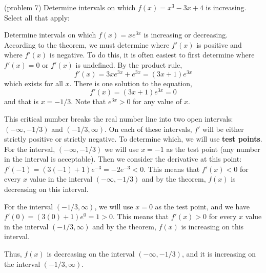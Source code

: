\documentclass[handout]{ximera}
\begin{document}
\begin{problem}(problem 7)
Determine intervals on which $f(x) = x^3 - 3x  + 4$ is increasing.\\
Select all that apply:
\begin{selectAll}
\end{selectAll}

\end{problem}


\begin{example}[example 8]
Determine intervals on which $f(x) = xe^{3x}$ is increasing or decreasing.\\
According to the theorem, we must determine where $f'(x)$ is positive and  
where $f'(x)$ is negative. 
To do this, it is often easiest to first determine where $f'(x) = 0$ or 
$f'(x)$ is undefined. By the  product rule, 
\[f'(x) = 3xe^{3x} + e^{3x} = (3x+1)e^{3x}\] 
which exists for all $x$. There is one solution to the equation,
\[f'(x) = (3x+1)e^{3x} = 0\] 
and that is  $x=-1/3$. 
Note that $e^{3x} > 0$ for any value of $x$.

This critical number breaks the real number line into two open 
intervals: $(-\infty, -1/3)$ and $(-1/3, \infty)$.
On each of these intervals, $f'$ will be either strictly positive or strictly negative.  
To determine which, we will use \textbf{test points}. 
For the interval, $(-\infty, -1/3)$ we will use $x=-1$ as the test 
point (any number in the interval is acceptable). 
Then we consider the derivative at this point: $f'(-1) = (3(-1) + 1)e^{-3} = -2e^{-3} <0$.
This means that $f'(x) < 0$ for every $x$ value in the 
interval $(-\infty, -1/3)$ and by the theorem, 
$f(x)$ is decreasing on this interval.



For the interval $(-1/3, \infty)$, we will use $x=0$ as the test point, and we 
have $f'(0) = (3(0)+1)e^0 = 1>0$. 
This means that $f'(x) > 0$ for every $x$ value in the interval $(-1/3, \infty)$ and by the theorem, 
$f(x)$ is increasing on this interval.


\begin{image}
\end{image}

Thus, $f(x)$ is decreasing on the interval $(-\infty, -1/3)$,
and it is increasing on the interval $(-1/3, \infty)$.
\end{example}
\end{document}
